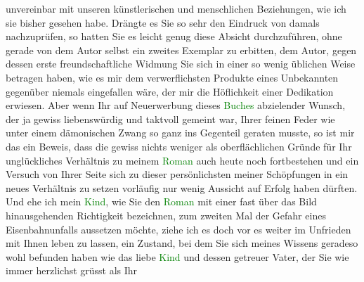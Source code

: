                unvereinbar mit unseren künstlerischen und menschlichen Beziehungen, wie ich sie
               bisher gesehen habe. Drängte es Sie so sehr den Eindruck von damals nachzuprüfen, so
               hatten Sie es leicht genug diese Absicht durchzuführen, ohne gerade von dem Autor
               selbst ein zweites Exemplar zu erbitten, dem Autor, gegen dessen erste
               freundschaftliche Widmung Sie sich in einer so wenig üblichen Weise betragen haben,
               wie es mir dem verwerflichsten Produkte eines Unbekannten gegenüber niemals einge{\pb}fallen wäre, der mir die Höflichkeit einer Dedikation
               erwiesen. Aber wenn Ihr auf Neuerwerbung dieses \textcolor{green}{Buches}{} abzielender Wunsch, der ja gewiss liebenswürdig und
               taktvoll gemeint war, Ihrer feinen Feder wie unter einem dämonischen Zwang so ganz
               ins Gegenteil geraten musste, so ist mir das ein Beweis, dass die gewiss nichts
               weniger als oberflächlichen Gründe für Ihr unglückliches Verhältnis zu meinem \textcolor{green}{Roman}{} auch heute noch fortbestehen
               und ein Versuch von Ihrer Seite sich zu dieser persönlichsten meiner Schöpfungen in
               ein neues Verhältnis zu setzen vorläufig nur wenig Aussicht auf Erfolg haben dürften.
               Und ehe ich mein \textcolor{green}{Kind}{}, wie Sie
               den \textcolor{green}{Roman}{} mit einer fast über das
               Bild hinausgehenden Richtigkeit bezeichnen, zum zweiten Mal der Gefahr eines \label{K_L01975_1v}\label{K_L01975_1h}
               Eisenbahnunfalls aussetzen möchte, ziehe ich es doch vor es weiter im Unfrieden mit
               Ihnen leben zu lassen, ein Zustand, bei dem Sie sich meines Wissens geradeso wohl
               befunden haben wie das liebe \textcolor{green}{Kind}{}
               und dessen getreuer Vater, der Sie wie immer herzlichst grüsst als\pend
           \pstart Ihr\pend{}\endnumbering{}  
      